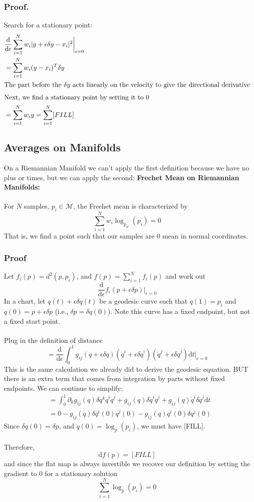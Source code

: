 \documentclass[10pt]{article}
\newcommand{\dd}{\text{d}}
\begin{document}
\subsubsection*{Proof.}
Search for a stationary point:
\begin{align*}
    &\frac{\dd}{\dd \epsilon}\sum_{i = 1}^N w_i |y + \epsilon \delta y - x_i|^2 \bigg|_{\epsilon = 0}\\
    &= \sum_{i = 1}^N w_i (y - x_i)^T \delta y\\
    \intertext{The part before the $\delta y$ acts linearly on the velocity to give the directional derivative}
    \intertext{Next, we find a stationary point by setting it to 0}
    &= \sum_{i = 1}^N w_i y = \sum_{i = 1}^N [FILL]
\end{align*}

\subsection*{Averages on Manifolds}
On a Riemannian Manifold we can't apply the first definition because we have no plus or times, but we can apply the second:
\textbf{Frechet Mean on Riemannian Manifolds:}\\\\
For $N$ samples, $p_i \in \mathcal{M}$, the Frechet mean is characterized by 
\[\sum_{i = 1}^N w_i \log_{\bar{p}_w} (p_i) = 0\]
That is, we find a point such that our samples are $0$ mean in normal coordinates.

\subsubsection*{Proof}
Let $f_i(p) = d^2(p, p_i)$, and $f(p) = \sum_{i = 1}^N f_i (p)$ and work out
\[\frac{\dd}{\dd \epsilon} f_i (p + \epsilon \delta p) \bigg|_{\epsilon = 0}\]
In a chart, let $q(t) + \epsilon \delta q(t)$ be a geodesic curve such that $q(1) = p_i$ and $q(0) = p + \epsilon \delta p$ (i.e., $\delta p = \delta q(0)$).  Note this curve has a fixed endpoint, but not a fixed start point.\\\\
Plug in the definition of distance
\[= \frac{\dd}{\dd \epsilon} \int_0^1 g_{ij} (q + \epsilon \delta q)(\dot{q}^i +\epsilon \delta \dot{q}^i) (\dot{q}^j + \epsilon \delta \dot{q}^j) \dd t \bigg|_{\epsilon = 0}\]
This is the same calculation we already did to derive the geodesic equation.  BUT there is an extra term that comes from integration by parts without fixed endpoints.  We can continue to simplify:
\begin{align*}
    &= \int_0^1 \partial_k g_{ij} (q) \delta q^k \dot{q}^i \dot{q}^j + g_{ij}(q) \delta \dot{q}^i \dot{q}^j + g_{ij}(q) \dot{q}^i \delta \dot{q}^j \dd t\\
    &= 0 - g_{ij} (q) \delta q^i(0) \dot{q}^j (0) - g_{ij} (q) q^i(0) \delta q^j(0)
\end{align*}
Since $\delta q(0) = \delta p$, and $\dot{q}(0) = \log_p(p_i)$, we must have [FILL].\\\\
Therefore,
\[\dd f(p) = [FILL]\]
and since the flat map is always invertible we recover our definition by setting the gradient to 0 for a stationary solution
\[\sum_{i = 1}^N \log_p(p_i) = 0\]
\end{document}

